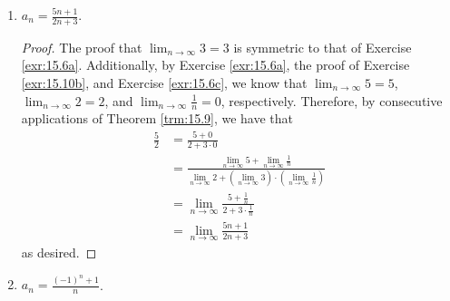 \documentclass[../main.tex]{subfiles}
\begin{document}
\begin{exercise}
\begin{enumerate}[label={(\alph*)},ref={\theexercise\alph*}]
\begin{proof}
\begin{align*}
                &< \frac{1}{n^2}\\
                &\leq \frac{1}{n}\\
                &= \left| \frac{1}{n} \right|\tag*{Definition \ref{dfn:8.4}}\\
                &< \epsilon
            \end{align*}
            as desired.\par
            The proof that $\lim_{n\to\infty}2=2$ is symmetric to that of Exercise \ref{exr:15.6a}.\par
            Having established that $\lim_{n\to\infty}\frac{1}{n^2+1}=0$, $\lim_{n\to\infty}2=2$, and $\lim_{n\to\infty}\frac{1}{n}=0$, we have by consecutive applications of Theorem \ref{trm:15.9} that
            \begin{align*}
                0 &= 0\cdot(2+0)\\
                &= \left( \lim_{n\to\infty}\frac{1}{n^2+1} \right)\cdot\left( \lim_{n\to\infty}2+\lim_{n\to\infty}\frac{1}{n} \right)\\
                &= \lim_{n\to\infty}\frac{1}{n^2+1}\left( 2+\frac{1}{n} \right)
            \end{align*}
            as desired.
        \end{proof}
        \item \label{exr:15.10c}$a_n=\frac{5n+1}{2n+3}$.
        \begin{proof}
            The proof that $\lim_{n\to\infty}3=3$ is symmetric to that of Exercise \ref{exr:15.6a}. Additionally, by Exercise \ref{exr:15.6a}, the proof of Exercise \ref{exr:15.10b}, and Exercise \ref{exr:15.6c}, we know that $\lim_{n\to\infty}5=5$, $\lim_{n\to\infty}2=2$, and $\lim_{n\to\infty}\frac{1}{n}=0$, respectively. Therefore, by consecutive applications of Theorem \ref{trm:15.9}, we have that
            \begin{align*}
                \frac{5}{2} &= \frac{5+0}{2+3\cdot 0}\\
                &= \frac{\lim_{n\to\infty}5+\lim_{n\to\infty}\frac{1}{n}}{\lim_{n\to\infty}2+\left( \lim_{n\to\infty}3 \right)\cdot\left( \lim_{n\to\infty}\frac{1}{n} \right)}\\
                &= \lim_{n\to\infty}\frac{5+\frac{1}{n}}{2+3\cdot\frac{1}{n}}\\
                &= \lim_{n\to\infty}\frac{5n+1}{2n+3}
            \end{align*}
            as desired.
        \end{proof}
        \item \label{exr:15.10d}$a_n=\frac{(-1)^n+1}{n}$.

\end{enumerate}
\end{exercise}
\end{document}

